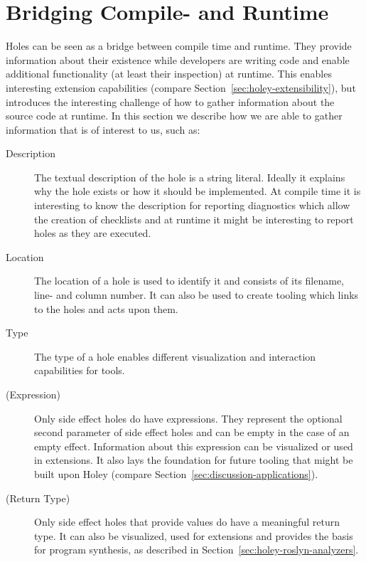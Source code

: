 \section{Bridging Compile- and Runtime}
\label{sec:holey-bridging-compile-and-runtime}
Holes can be seen as a bridge between compile time and runtime.
They provide information about their existence while developers are writing code and enable additional functionality (at least their inspection) at runtime.
This enables interesting extension capabilities (compare Section~\ref{sec:holey-extensibility}), but introduces the interesting challenge of how to gather information about the source code at runtime.
In this section we describe how we are able to gather information that is of interest to us, such as:
\begin{description}
    \item[Description] The textual description of the hole is a string literal. Ideally it explains why the hole exists or how it should be implemented. At compile time it is interesting to know the description for reporting diagnostics which allow the creation of checklists and at runtime it might be interesting to report holes as they are executed.
    \item[Location] The location of a hole is used to identify it and consists of its filename, line- and column number. It can also be used to create tooling which links to the holes and acts upon them.
    \item[Type] The type of a hole enables different visualization and interaction capabilities for tools.
    \item[(Expression)] Only side effect holes do have expressions. They represent the optional second parameter of side effect holes and can be empty in the case of an empty effect. Information about this expression can be visualized or used in extensions. It also lays the foundation for future tooling that might be built upon Holey (compare Section~\ref{sec:discussion-applications}).
    \item[(Return Type)] Only side effect holes that provide values do have a meaningful return type. It can also be visualized, used for extensions and provides the basis for program synthesis, as described in Section~\ref{sec:holey-roslyn-analyzers}.
\end{description}

